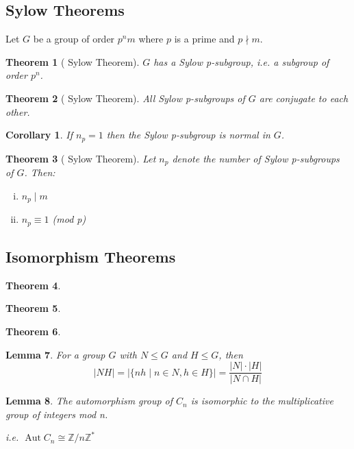 \documentclass[a4paper, oneside, 12pt, final]{article}
\newtheorem{theorem}{Theorem}[section]
\newtheorem{corollary}{Corollary}[theorem]
\newtheorem{lemma}[theorem]{Lemma}
\theoremstyle{definition}
\DeclareMathOperator{\Aut}{Aut}
\newcommand{\Z}{\mathbb{Z}}
\newcommand{\Zn}[1]{\Z/#1\Z}
\begin{document}
\subsection{Sylow Theorems}
Let \(G\) be a group of order \(p^nm\) where \(p\) is a prime and \(p\nmid m\).
\begin{theorem}[ Sylow Theorem]
\label{thm:sylow1}
    \(G\) has a Sylow p-subgroup, i.e. a subgroup of order \(p^n\).
\end{theorem}
\begin{theorem}[ Sylow Theorem]
\label{thm:sylow2}
    All Sylow p-subgroups of \(G\) are conjugate to each other.
\end{theorem}
\begin{corollary}
    If \(n_p = 1\) then the Sylow p-subgroup is normal in \(G\).
\end{corollary}
\begin{theorem}[ Sylow Theorem]
\label{thm:sylow3}
    Let \(n_p\) denote the number of Sylow p-subgroups of \(G\).
    Then:
    \begin{enumerate}[i)]
        \item \(n_p \mid m\)
        \item \(n_p\equiv 1\) (mod p)
    \end{enumerate}
\end{theorem}

\subsection{Isomorphism Theorems}
\begin{theorem}
\label{thm:iso1}
\end{theorem}

\begin{theorem}
\label{thm:iso2}
\end{theorem}

\begin{theorem}
\label{thm:iso3}
\end{theorem}

\begin{lemma}
\label{lem:setprodorder}
    For a group \(G\) with \(N \leqslant G\) and \(H \leqslant G\), then
    \[|NH| = |\{nh \mid n \in N, h \in H\}| = \frac{|N| \cdot |H|}{|N \cap H|}\]
\end{lemma}

\begin{lemma}
\label{lem:aut}
    The automorphism group of \(C_n\) is isomorphic to the multiplicative group of integers mod n.

    i.e. \(\Aut{C_n} \cong \Zn{n}^*\)
\end{lemma}
\end{document}

